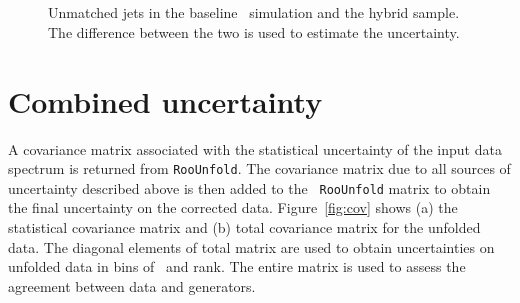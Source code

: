 \begin{figure}
~
~
\\
~
~
~
\caption{Unmatched jets in the baseline \ttbar\ simulation and the hybrid sample. The difference between the two is used to estimate the uncertainty.}
\label{fig:FalseComp}
\end{figure}

\section{Combined uncertainty}
A covariance matrix associated with the statistical uncertainty of the input data spectrum is returned from \texttt{RooUnfold}. The covariance matrix due to all sources of uncertainty described above is then added to the \texttt{ RooUnfold} matrix to obtain the final uncertainty on the corrected data. Figure~\ref{fig:cov}  shows (a) the statistical covariance matrix  and (b) total covariance matrix for the unfolded data. The diagonal elements of total matrix are used to obtain uncertainties on unfolded data in bins of \pt\ and rank. The entire matrix is used to assess the agreement between data and generators. 

